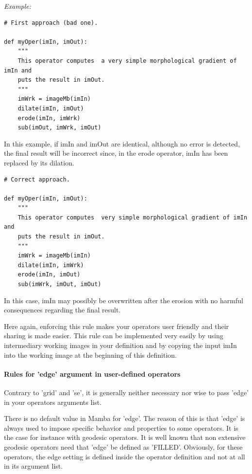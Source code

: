 \documentclass[a4paper,10pt,oneside]{article}
\begin{document}
\emph{Example:}

\lstset{language=Python}
\begin{lstlisting}
# First approach (bad one).

def myOper(imIn, imOut):
    """
    This operator computes  a very simple morphological gradient of imIn and
    puts the result in imOut.
    """
    imWrk = imageMb(imIn)
    dilate(imIn, imOut)
    erode(imIn, imWrk)
    sub(imOut, imWrk, imOut)
\end{lstlisting}

In this example, if imIn and imOut are identical, although no error is detected, 
the final result will be incorrect since, in the erode operator, imIn has been 
replaced by its dilation.

\lstset{language=Python}
\begin{lstlisting}
# Correct approach.

def myOper(imIn, imOut):
    """
    This operator computes  very simple morphological gradient of imIn and
    puts the result in imOut.
    """
    imWrk = imageMb(imIn)
    dilate(imIn, imWrk)
    erode(imIn, imOut)
    sub(imWrk, imOut, imOut)
\end{lstlisting}

In this case, imIn may possibly be overwritten after the erosion with no harmful 
consequences regarding the final result.

Here again, enforcing this rule makes your operators user friendly and their 
sharing is made easier. This rule can be implemented very easily by using 
intermediary working images in your definition and by copying the input imIn 
into the working image at the beginning of this definition. 


\paragraph{Rules for 'edge' argument in user-defined operators}

Contrary to 'grid' and 'se', it is generally neither necessary nor wise  to 
pass 'edge' in your operators arguments list. 

There is no default value in Mamba for 'edge'. The reason of this is that 'edge' 
is always used to impose specific behavior and properties to some operators. 
It is the case for instance with geodesic operators.  It is well known that non 
extensive geodesic operators need that 'edge' be defined as 'FILLED'. Obviously, 
for these operators, the edge setting is defined inside the operator definition 
and not at all in its argument list.
\end{document}
